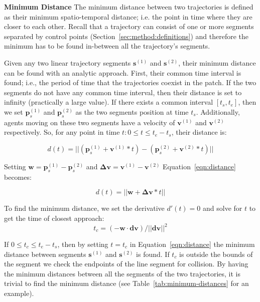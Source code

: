\textbf{Minimum Distance} The minimum distance between two trajectories is defined as their minimum spatio-temporal distance; i.e. the point in time where they are closer to each other.
Recall that a trajectory can consist of one or more segments separated by control points (Section~\ref{sec:method:definitions}) and therefore the minimum has to be found in-between all the trajectory's segments.

Given any two linear trajectory segments $\mathbf{s}^{(1)}$ and $\mathbf{s}^{(2)}$, their minimum distance can be found with an analytic approach.
First, their common time interval is found; i.e., the period of time that the trajectories coexist in the patch.
If the two segments do not have any common time interval, then their distance is set to infinity (practically a large value).
If there exists a common interval $[t_{s}, t_{e}]$, then we set $\mathbf{p}_s^{(1)}$ and $\mathbf{p}_s^{(2)}$
as the two segments position at time $t_s$.
Additionally, agents moving on these two segments have a velocity of $\mathbf{v}^{(1)}$ and $\mathbf{v}^{(2)}$ respectively.
So, for any point in time $t: 0 \le t \le t_e - t_s$, their distance is:

\begin{equation}
	d(t) = || (\mathbf{p}_s^{(1)}+\mathbf{v}^{(1)} * t) -
				(\mathbf{p}_s^{(2)}+\mathbf{v}^{(2)} * t) ||
	\label{eqn:distance}
\end{equation}

Setting $ \mathbf{w} = \mathbf{p}_s^{(1)} - \mathbf{p}_s^{(2)}$ and $\mathbf{\Delta{v}} = \mathbf{v}^{(1)} - \mathbf{v}^{(2)}$ Equation~\ref{eqn:distance} becomes:

\begin{equation}
	d(t) = || \mathbf{w} + \mathbf{\Delta{v}}*t ||
	\label{eqn:distance_simple}
\end{equation}

To find the minimum distance, we set the derivative  $d'(t) = 0$ and solve for $t$ to get the time of closest approach:
\begin{equation}
	t_c = (-\mathbf{w} \cdot \mathbf{dv}) / || \mathbf{dv} || ^ 2
	\label{eqn:distance_time}
\end{equation}

If $0 \le t_c \le t_e - t_s$, then by setting $t = t_c$ in Equation~\ref{eqn:distance} the minimum distance between segments $\mathbf{s}^{(1)}$ and $\mathbf{s}^{(2)}$ is found.
If $t_c$ is outside the bounds of the segment we check the endpoints of the line segment for collision.
By having the minimum distances between all the segments of the two trajectories, it is trivial to find the minimum distance (see Table~\ref{tab:minimum-distances} for an example).


